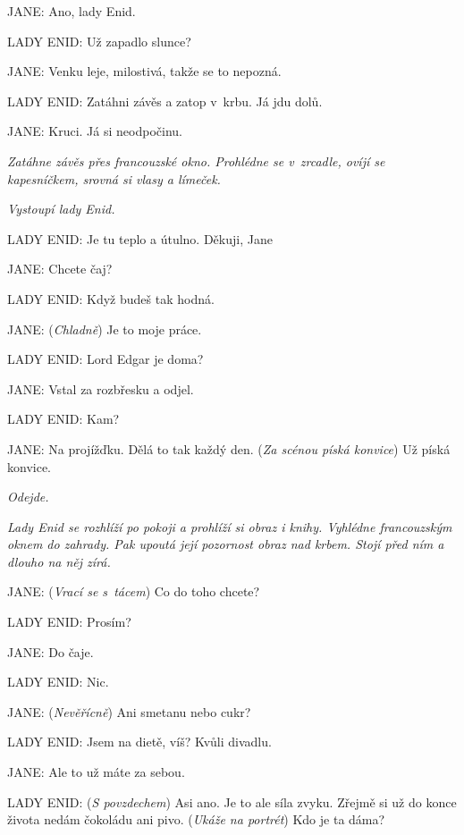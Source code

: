 \noindent
JANE: Ano, lady Enid.

\noindent
LADY ENID: Už zapadlo slunce?

\noindent
JANE: Venku leje, milostivá, takže se to nepozná.

\noindent
LADY ENID: Zatáhni závěs a zatop v krbu. Já jdu dolů.

\noindent
JANE: Kruci. Já si neodpočinu.

\smallskip

\noindent
\textit{Zatáhne závěs přes francouzské okno. Prohlédne se v zrcadle, ovíjí se kapesníčkem, srovná si vlasy a límeček.}

\noindent
\textit{Vystoupí lady Enid.}

\smallskip

\noindent
LADY ENID: Je tu teplo a útulno. Děkuji, Jane

\noindent
JANE: Chcete čaj?

\noindent
LADY ENID: Když budeš tak hodná.

\noindent
JANE: (\textit{Chladně}) Je to moje práce.

\noindent
LADY ENID: Lord Edgar je doma?

\noindent
JANE: Vstal za rozbřesku a odjel.

\noindent
LADY ENID: Kam?

\noindent
JANE: Na projížďku. Dělá to tak každý den. (\textit{Za scénou píská konvice}) Už píská konvice.

\smallskip

\noindent
\textit{Odejde.}

\noindent
\textit{Lady Enid se rozhlíží po pokoji a prohlíží si obraz i knihy. Vyhlédne francouzským oknem do zahrady. Pak upoutá její pozornost obraz nad krbem. Stojí před ním a dlouho na něj zírá.}

\smallskip

\noindent
JANE: (\textit{Vrací se s tácem}) Co do toho chcete?

\noindent
LADY ENID: Prosím?

\noindent
JANE: Do čaje.

\noindent
LADY ENID: Nic.

\noindent
JANE: (\textit{Nevěřícně}) Ani smetanu nebo cukr?

\noindent
LADY ENID: Jsem na dietě, víš? Kvůli divadlu.

\noindent
JANE: Ale to už máte za sebou.

\noindent
LADY ENID: (\textit{S povzdechem}) Asi ano. Je to ale síla zvyku. Zřejmě si už do konce života nedám čokoládu ani pivo. (\textit{Ukáže na portrét}) Kdo je ta dáma?

